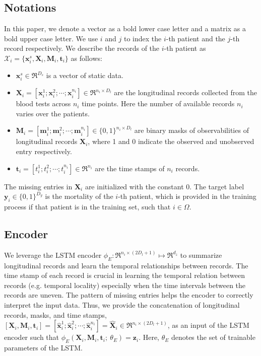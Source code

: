 \subsection{Notations}
In this paper, we denote a vector as a bold lower case letter and a matrix as a bold upper case letter. 
We use $i$ and $j$ to index the $i$-th patient and the $j$-th record respectively. We describe the records of the $i$-th patient as $\mathcal{X}_i = \{\mathbf{x}_i^s, \mathbf{X}_i, \mathbf{M}_i, \mathbf{t}_i\}$ as follows:
\begin{itemize}
    \item $\mathbf{x}_i^s \in \Re^{D_s}$ is a vector of static data.
    \item $\mathbf{X}_i = [\mathbf{x}_i^1; \mathbf{x}_i^2; \cdots; \mathbf{x}_i^{n_i}] \in \Re^{n_i \times D_l}$ are the longitudinal records collected from the blood tests across $n_i$ time points. Here the number of available records $n_i$ varies over the patients.
    \item $\mathbf{M}_i = [\mathbf{m}_i^1; \mathbf{m}_i^2; \cdots; \mathbf{m}_i^{n_i}] \in \{0, 1\}^{n_i \times D_l}$ are binary masks of observabilities of longitudinal records $\mathbf{X}_i$, where 1 and 0 indicate the observed and unobserved entry respectively.
    \item $\mathbf{t}_i = [t_i^1; t_i^2; \cdots; t_i^{n_i}] \in \Re^{n_i}$ are the time stamps of $n_i$ records.
\end{itemize}
The missing entries in $\mathbf{X}_i$ are initialized with the constant $0$. The target label $\mathbf{y}_i \in \{0, 1\}^{D_y}$ is the mortality of the $i$-th patient, which is provided in the training process if that patient is in the training set, such that $i \in \Omega$.

\subsection{Encoder}
We leverage the LSTM encoder $\phi_{E}: \Re^{n_i \times (2 D_l + 1)} \mapsto \Re^{d_z}$ to summarize longitudinal records and learn the temporal relationships between records. The time stamp of each record is crucial in learning the temporal relation between records (e.g. temporal locality) especially when the time intervals between the records are uneven. The pattern of missing entries helps the encoder to correctly interpret the input data. Thus, we provide the concatenation of longitudinal records, masks, and time stamps, $[\mathbf{X}_i, \mathbf{M}_i, \mathbf{t}_i] = [\hat{\mathbf{x}}_i^1; \hat{\mathbf{x}}_i^2; \cdots; \hat{\mathbf{x}}_i^{n_i}] = \hat{\mathbf{X}}_i \in \Re^{n_i \times (2 D_l + 1)}$, as an input of the LSTM encoder such that $\phi_{E}(\mathbf{X}_i, \mathbf{M}_i, \mathbf{t}_i;\ \theta_E) = \mathbf{z}_i$. Here, $\theta_E$ denotes the set of trainable parameters of the LSTM.

